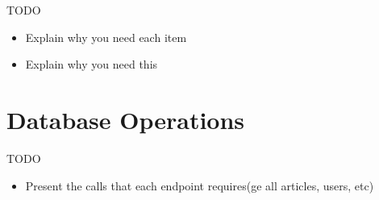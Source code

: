 TODO
\begin{itemize}
	\item Explain why you need each item
	\item Explain why you need this	
\end{itemize}



\section{Database Operations}
\label{sec:database-operations}

TODO
\begin{itemize}
	\item Present the calls that each endpoint requires(ge all articles, users, etc)
\end{itemize}


